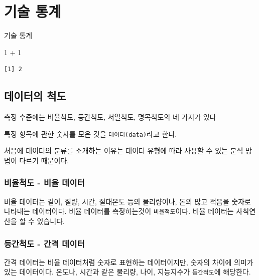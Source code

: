 \documentclass[
  letterpaper,
  DIV=11,
  numbers=noendperiod]{scrreprt}
\newenvironment{Shaded}{\begin{snugshade}}{\end{snugshade}}
\newcommand{\DecValTok}[1]{\textcolor[rgb]{0.68,0.00,0.00}{#1}}
\newcommand{\SpecialCharTok}[1]{\textcolor[rgb]{0.37,0.37,0.37}{#1}}
\begin{document}
\part{기술 통계}

기술 통계

\begin{Shaded}
\begin{Highlighting}[]
\DecValTok{1} \SpecialCharTok{+} \DecValTok{1}
\end{Highlighting}
\end{Shaded}

\begin{verbatim}
[1] 2
\end{verbatim}

\hypertarget{uxb370uxc774uxd130uxc758-uxcc99uxb3c4}{%
\chapter{데이터의 척도}\label{uxb370uxc774uxd130uxc758-uxcc99uxb3c4}}

측정 수준에는 비율척도, 둥간척도, 서열척도, 명목척도의 네 가지가 있다

특정 항목에 관한 숫자를 모은 것을 \texttt{데이터(data)}라고 한다.

처음에 데이터의 분류를 소개하는 이유는 데이터 유형에 따라 사용할 수 있는
분석 방법이 다르기 때문이다.

\hypertarget{uxbe44uxc728uxcc99uxb3c4---uxbe44uxc728-uxb370uxc774uxd130}{%
\section{비율척도 - 비율
데이터}\label{uxbe44uxc728uxcc99uxb3c4---uxbe44uxc728-uxb370uxc774uxd130}}

비율 데이터는 길이, 질량, 시간, 절대온도 등의 물리량이나, 돈의 많고
적음을 숫자로 나타내는 데이터이다. 비율 데이터를 측정하는것이
\texttt{비율척도}이다. 비율 데이터는 사칙연산을 할 수 있습니다.

\hypertarget{uxb4f1uxac04uxcc99uxb3c4---uxac04uxaca9-uxb370uxc774uxd130}{%
\section{등간척도 - 간격
데이터}\label{uxb4f1uxac04uxcc99uxb3c4---uxac04uxaca9-uxb370uxc774uxd130}}

간격 데이터는 비율 데이터처럼 숫자로 표현하는 데이터이지만, 숫자의
차이에 의미가 있는 데이터이다. 온도나, 시간과 같은 물리량, 나이,
지능지수가 \texttt{등간척도}에 해당한다.
\end{document}
